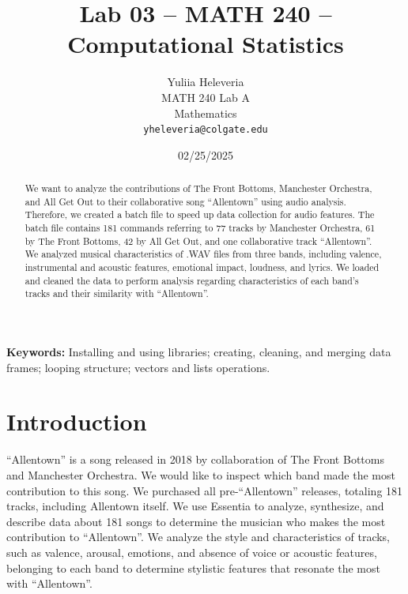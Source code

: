\documentclass{article}\usepackage[]{graphicx}\usepackage[]{xcolor}
\begin{document}
\vspace{-1in}
\title{Lab 03 -- MATH 240 -- Computational Statistics}

\author{
  Yuliia Heleveria \\
  MATH 240 Lab A  \\
  Mathematics  \\
  {\tt yheleveria@colgate.edu}
}

\date{02/25/2025}

\maketitle

\begin{multicols}{2}
\begin{abstract}
We want to analyze the contributions of The Front Bottoms, Manchester Orchestra, and All Get Out to their collaborative song ``Allentown'' using audio analysis. Therefore, we created a batch file to speed up data collection for audio features. The batch file contains 181 commands referring to 77 tracks by Manchester Orchestra, 61 by The Front Bottoms, 42 by All Get Out, and one collaborative track ``Allentown''. We analyzed musical characteristics of .WAV files from three bands, including valence, instrumental and acoustic features, emotional impact, loudness, and lyrics. We loaded and cleaned the data to perform analysis regarding characteristics of each band's tracks and their similarity with ``Allentown''. 
\end{abstract}

\noindent \textbf{Keywords:} Installing and using libraries; creating, cleaning, and merging data frames; looping structure; vectors and lists operations.

\section{Introduction}
``Allentown'' is a song released in 2018 by collaboration of The Front Bottoms and Manchester Orchestra. We would like to inspect which band made the most contribution to this song. We purchased all pre-``Allentown'' releases, totaling 181 tracks, including Allentown itself.
We use Essentia \citep{bogdanov2013essentia} to analyze, synthesize, and describe data about 181 songs to determine the musician who makes the most contribution to ``Allentown''. We analyze the style and characteristics of tracks, such as valence, arousal, emotions, and absence of voice or acoustic features, belonging to each band to determine stylistic features that resonate the most with ``Allentown''. 


\end{multicols}
\end{document}

